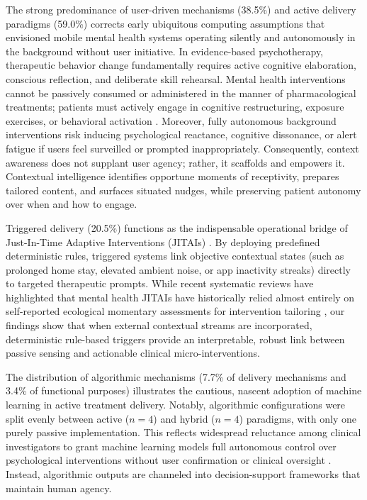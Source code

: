 The strong predominance of user-driven mechanisms (38.5\%) and active delivery paradigms (59.0\%) corrects early ubiquitous computing assumptions that envisioned mobile mental health systems operating silently and autonomously in the background without user initiative. In evidence-based psychotherapy, therapeutic behavior change fundamentally requires active cognitive elaboration, conscious reflection, and deliberate skill rehearsal. Mental health interventions cannot be passively consumed or administered in the manner of pharmacological treatments; patients must actively engage in cognitive restructuring, exposure exercises, or behavioral activation \cite{balaskas2021ecological, leaning2024smartphone}. Moreover, fully autonomous background interventions risk inducing psychological reactance, cognitive dissonance, or alert fatigue if users feel surveilled or prompted inappropriately. Consequently, context awareness does not supplant user agency; rather, it scaffolds and empowers it. Contextual intelligence identifies opportune moments of receptivity, prepares tailored content, and surfaces situated nudges, while preserving patient autonomy over when and how to engage.

Triggered delivery (20.5\%) functions as the indispensable operational bridge of Just-In-Time Adaptive Interventions (JITAIs) \cite{nahumshani2018jitai, nahum2025just}. By deploying predefined deterministic rules, triggered systems link objective contextual states (such as prolonged home stay, elevated ambient noise, or app inactivity streaks) directly to targeted therapeutic prompts. While recent systematic reviews have highlighted that mental health JITAIs have historically relied almost entirely on self-reported ecological momentary assessments for intervention tailoring \cite{van2025beyond, hsu2025personalized}, our findings show that when external contextual streams are incorporated, deterministic rule-based triggers provide an interpretable, robust link between passive sensing and actionable clinical micro-interventions.

The distribution of algorithmic mechanisms (7.7\% of delivery mechanisms and 3.4\% of functional purposes) illustrates the cautious, nascent adoption of machine learning in active treatment delivery. Notably, algorithmic configurations were split evenly between active ($n = 4$) and hybrid ($n = 4$) paradigms, with only one purely passive implementation. This reflects widespread reluctance among clinical investigators to grant machine learning models full autonomous control over psychological interventions without user confirmation or clinical oversight \cite{adler2024actionablesensing, rogan2024health}. Instead, algorithmic outputs are channeled into decision-support frameworks that maintain human agency.

